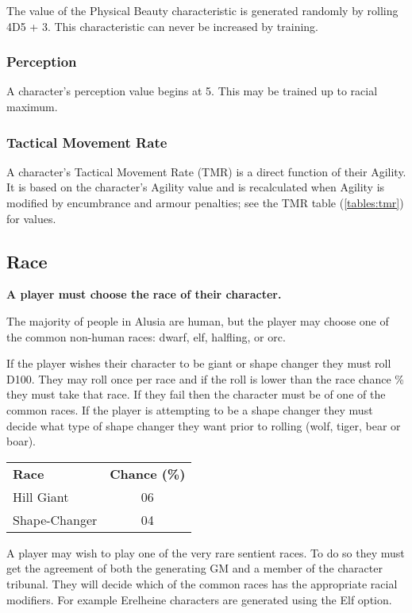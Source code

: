\begin{multicols*}{3}
The value of the Physical Beauty characteristic is generated randomly
by rolling 4D5 + 3. This characteristic can never be increased by
training.

\subsubsection{Perception}

A character's perception value begins at 5. This may be trained up to
racial maximum.

\subsubsection{Tactical Movement Rate}

A character's Tactical Movement Rate (TMR) is a direct function of
their Agility. It is based on the character's Agility value and is
recalculated when Agility is modified by encumbrance and armour
penalties; see the TMR table (\ref{tables:tmr}) for values.

\subsection{Race}
\label{chargen:race}

\textbf{A player must choose the race of their character.}

The majority of people in Alusia are human, but the player may choose
one of the common non-human races: dwarf, elf, halfling, or orc.

If the player wishes their character to be giant or shape changer they
must roll D100.  They may roll once per race and if the roll is lower
than the race chance \% they must take that race.  If they fail then
the character must be of one of the common races.  If the player is
attempting to be a shape changer they must decide what type of shape
changer they want prior to rolling (\ie wolf, tiger, bear or boar).

\begin{tabular}{lc}
\textbf{Race} &	\textbf{Chance (\%)} \\
Hill Giant	& 06 \\
Shape-Changer	& 04 \\
\end{tabular}

A player may wish to play one of the very rare sentient races.  To do
so they must get the agreement of both the generating GM and a member
of the character tribunal.  They will decide which of the common races
has the appropriate racial modifiers.  For example Erelheine
characters are generated using the Elf option.


\end{multicols*}
